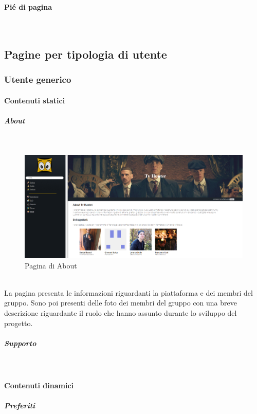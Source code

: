 \paragraph{Pié di pagina}
~\\
\subsection{Pagine per tipologia di utente}

\subsubsection{Utente generico}
\paragraph{Contenuti statici}

\subparagraph{About} 
~\\	

\begin{figure}[h!]
	\centerline{\includegraphics[scale=0.4]{img/about.png}}
	\caption{Pagina di About}
	\label{fig:addForm}
\end{figure}	

~\\	
La pagina presenta le informazioni riguardanti la piattaforma e dei membri del gruppo. Sono poi presenti delle foto dei membri del gruppo con una breve descrizione riguardante il ruolo che hanno assunto durante lo sviluppo del progetto. 
~\\	
\subparagraph{Supporto} 

~\\

\paragraph{Contenuti dinamici}   

\subparagraph{Preferiti}

